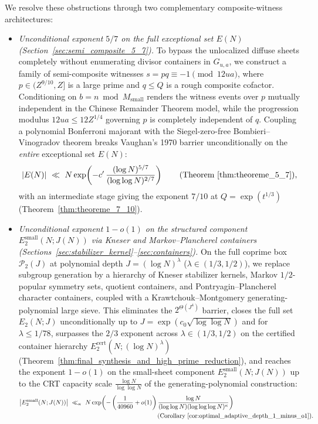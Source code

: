 \documentclass[11pt, a4paper]{article}
\theoremstyle{plain}
\theoremstyle{definition}
\begin{document}
We resolve these obstructions through two complementary composite-witness architectures:
\begin{itemize}
    \item \emph{Unconditional exponent $5/7$ on the full exceptional set $E(N)$ (Section~\ref{sec:semi_composite_5_7}).} To bypass the unlocalized diffuse sheets completely without enumerating divisor containers in $G_{u,a}$, we construct a family of semi-composite witnesses $s=pq\equiv-1\pmod{12ua}$, where $p\in(Z^{9/10},Z]$ is a large prime and $q\le Q$ is a rough composite cofactor. Conditioning on $b=n\bmod M_{\mathrm{small}}$ renders the witness events over $p$ mutually independent in the Chinese Remainder Theorem model, while the progression modulus $12ua\le 12Z^{1/4}$ governing $p$ is completely independent of $q$. Coupling a polynomial Bonferroni majorant with the Siegel-zero-free Bombieri--Vinogradov theorem breaks Vaughan's 1970 barrier unconditionally on the \emph{entire} exceptional set $E(N)$:
    \[
    |E(N)|\ \ll\ N\exp\!\left(-c'\,\frac{(\log N)^{5/7}}{(\log\log N)^{2/7}}\right)\qquad(\text{Theorem~\ref{thm:theoreme_5_7}}),
    \]
    with an intermediate stage giving the exponent $7/10$ at $Q=\exp(t^{1/3})$ (Theorem~\ref{thm:theoreme_7_10}).
    \item \emph{Unconditional exponent $1-o(1)$ on the structured component $E_2^{\mathrm{small}}(N;J(N))$ via Kneser and Markov--Plancherel containers (Sections~\ref{sec:stabilizer_kernel}--\ref{sec:containers}).} On the full coprime box $\mathcal{P}_2(J)$ at polynomial depth $J=(\log N)^{\lambda}$ ($\lambda\in(1/3,1/2)$), we replace subgroup generation by a hierarchy of Kneser stabilizer kernels, Markov $1/2$-popular symmetry sets, quotient containers, and Pontryagin--Plancherel character containers, coupled with a Krawtchouk--Montgomery generating-polynomial large sieve. This eliminates the $2^{\Theta(J^{4})}$ barrier, closes the full set $E_2(N;J)$ unconditionally up to $J=\exp(c_0\sqrt{\log\log N})$ and for $\lambda\le 1/78$, surpasses the $2/3$ exponent across $\lambda\in(1/3,1/2)$ on the certified container hierarchy $E_2^{\mathrm{cert}}(N;(\log N)^{\lambda})$ (Theorem~\ref{thm:final_synthesis_and_high_prime_reduction}), and reaches the exponent $1-o(1)$ on the small-sheet component $E_2^{\mathrm{small}}(N;J(N))$ up to the CRT capacity scale $\frac{\log N}{\log\log N}$ of the generating-polynomial construction:
    \[
    \begin{aligned}
    \big|E_2^{\mathrm{small}}(N;J(N))\big|\ &\ll_\kappa\ N\exp\!\left(-\left(\frac{1}{40960}+o(1)\right)\frac{\log N}{(\log\log N)(\log\log\log N)^{\kappa}}\right)\\
    &\qquad\qquad\qquad\qquad\qquad\qquad\qquad(\text{Corollary~\ref{cor:optimal_adaptive_depth_1_minus_o1}}).
    \end{aligned}
    \]
\end{itemize}
\end{document}
